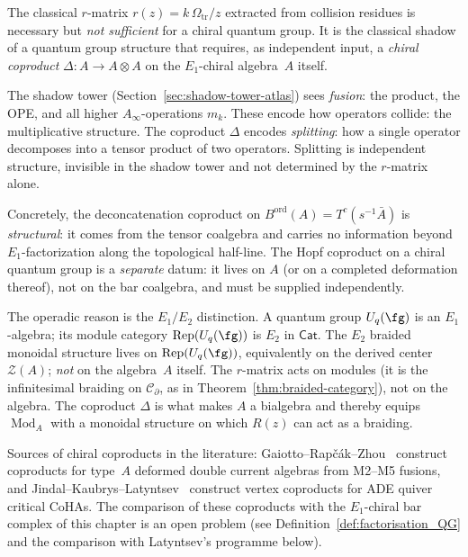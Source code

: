 \begin{remark}
\label{rem:r-matrix-coproduct-warning}
The classical $r$-matrix $r(z) = k\,\Omega_{\mathrm{tr}}/z$ extracted from collision
residues is necessary but \emph{not sufficient} for a chiral quantum
group. It is the classical shadow of a quantum group structure that
requires, as independent input, a \emph{chiral coproduct}
$\Delta \colon A \to A \otimes A$ on the $E_1$-chiral algebra~$A$
itself.

The shadow tower (Section~\ref{sec:shadow-tower-atlas}) sees \emph{fusion}: the product,
the OPE, and all higher $A_\infty$-operations $m_k$. These encode
how operators collide: the multiplicative structure. The coproduct
$\Delta$ encodes \emph{splitting}: how a single operator decomposes
into a tensor product of two operators. Splitting is independent
structure, invisible in the shadow tower and not determined by the
$r$-matrix alone.

Concretely, the deconcatenation coproduct on
$B^{\mathrm{ord}}(A) = T^c(s^{-1}\bar A)$ is \emph{structural}:
it comes from the tensor coalgebra and carries no information beyond
$E_1$-factorization along the topological half-line. The Hopf
coproduct on a chiral quantum group is a \emph{separate} datum: it
lives on $A$ (or on a completed deformation thereof), not on the bar
coalgebra, and must be supplied independently.

The operadic reason is the $E_1/E_2$ distinction. A quantum group
$U_q(\fg)$ is an $E_1$-algebra; its module category
$\operatorname{Rep}(U_q(\fg))$ is $E_2$ in $\mathsf{Cat}$. The
$E_2$ braided monoidal structure lives on
$\operatorname{Rep}(U_q(\fg))$, equivalently on the derived center
$\mathcal{Z}(A)$; \emph{not} on the algebra~$A$ itself. The
$r$-matrix acts on modules (it is the infinitesimal braiding on
$\mathcal{C}_\partial$, as in Theorem~\ref{thm:braided-category}),
not on the algebra. The coproduct $\Delta$ is what makes $A$ a
bialgebra and thereby equips $\operatorname{Mod}_A$ with a monoidal
structure on which $R(z)$ can act as a braiding.

Sources of chiral coproducts in the literature:
Gaiotto--Rap\v{c}\'ak--Zhou~\cite{GRZ23} construct coproducts for
type~$A$ deformed double current algebras from M2--M5 fusions, and
Jindal--Kaubrys--Latyntsev~\cite{JKL26} construct vertex coproducts
for ADE quiver critical CoHAs. The comparison of these coproducts
with the $E_1$-chiral bar complex of this chapter is an open problem
(see Definition~\ref{def:factorisation_QG} and the comparison
with Latyntsev's programme below).
\end{remark}

